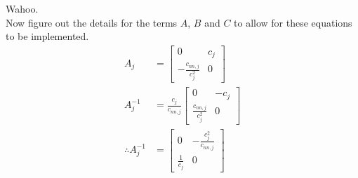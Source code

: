 \documentclass{article}
\begin{document}
Wahoo.\\
Now figure out the details for the terms $A$, $B$ and $C$ to allow for these equations to be implemented.
\begin{align*}
	A_j                 & = \begin{bmatrix} 0 & c_j  \\ -\frac{c_{nn, j}}{c_j^2} & 0\end{bmatrix}                                                                                                                                                                                                                                                                                                                                                                                                                                                                                                                                                                                                                                                                         \\
	A_j^{-1}            & = \frac{c_j}{c_{nn, j}}\begin{bmatrix} 0 & -c_j  \\ \frac{c_{nn, j}}{c_j^2} & 0\end{bmatrix}                                                                                                                                                                                                                                                                                                                                                                                                                                                                                                                                                                                                                                                    \\
	\therefore A_j^{-1} & = \begin{bmatrix} 0 & -\frac{c^2_j}{c_{nn, j}}  \\ \frac{1}{c_j} & 0\end{bmatrix}                                                                                                                                                                                                                                                                                                                                                                                                                                                                                                                                                                                                                                                               \\

\end{align*}
\end{document}
